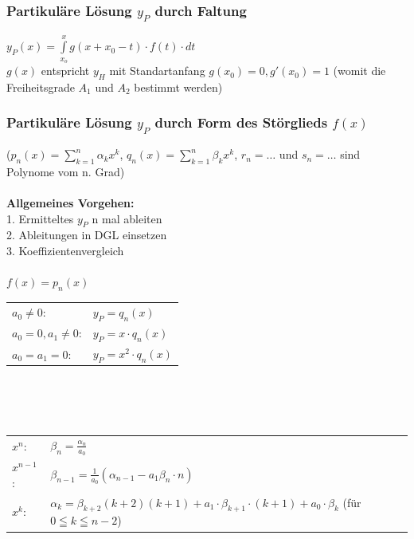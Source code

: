\subsubsection{Partikuläre Lösung $y_P$ durch Faltung}
$y_P(x)=\int\limits_{x_o}^{x} g(x+x_0-t) \cdot f(t) \cdot dt$ \\

$g(x)$ entspricht $y_H$ mit Standartanfang $g(x_0) = 0, g'(x_0)
= 1$ (womit die Freiheitsgrade $A_1$ und $A_2$ bestimmt werden)

\subsubsection{Partikuläre Lösung $y_P$ durch Form des Störglieds $f(x)$}
 ($p_n(x) = \sum_{k=1}^{n}\alpha_k x^k$,
$q_n(x)=\sum_{k=1}^{n} \beta_k x^k$, $r_n=\ldots$ und $s_n=\ldots$ sind Polynome vom
n. Grad)\\ \\
\textbf{Allgemeines Vorgehen:}\\
1. Ermitteltes $y_P$ n mal ableiten \\
2. Ableitungen in DGL einsetzen \\
3. Koeffizientenvergleich \\ \\
\underline{$f(x)=p_n(x)$}\\
\begin{tabular}{p{8cm}p{4cm}}
$a_0\neq 0$:          & $y_P = q_n(x)$\\
$a_0 = 0 , a_1\neq 0$:& $y_P=x\cdot q_n(x)$\\
$a_0=a_1=0$:          & $y_P=x^2\cdot q_n(x)$\\
\end{tabular}\\ \\ \\
\begin{tabular}{p{2cm}p{10cm}}
$x^n$: & $\beta_n = \frac{\alpha_n}{a_0}$ \\ 
$x^{n-1}$: & $\beta_{n-1} = \frac{1}{a_0}(\alpha_{n-1} - a_1\beta_n \cdot n)$ \\
$x^k$: & $\alpha_k = \beta_{k+2}(k+2)(k+1)+a_1 \cdot \beta_{k+1} \cdot (k + 1) +
a_0 \cdot \beta_k $ (für $0 \leqq k \leqq n-2 $)
\end{tabular} \\ \\

